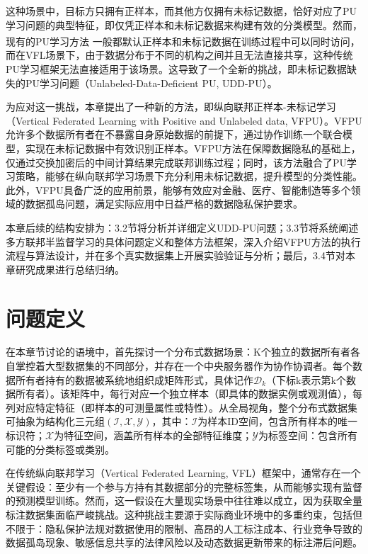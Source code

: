 这种场景中，目标方只拥有正样本，而其他方仅拥有未标记数据，恰好对应了PU学习问题的典型特征，即仅凭正样本和未标记数据来构建有效的分类模型。然而，现有的PU学习方法\textsuperscript{\cite{mordelet2014bagging, liu2003building, liu2015classification, xu2017multi}} 一般都默认正样本和未标记数据在训练过程中可以同时访问，而在VFL场景下，由于数据分布于不同的机构之间并且无法直接共享，这种传统PU学习框架无法直接适用于该场景。这导致了一个全新的挑战，即未标记数据缺失的PU学习问题（Unlabeled-Data-Deficient PU, UDD-PU）。

为应对这一挑战，本章提出了一种新的方法，即纵向联邦正样本-未标记学习（Vertical Federated Learning with Positive and Unlabeled data, VFPU）。VFPU允许多个数据所有者在不暴露自身原始数据的前提下，通过协作训练一个联合模型，实现在未标记数据中有效识别正样本。VFPU方法在保障数据隐私的基础上，仅通过交换加密后的中间计算结果完成联邦训练过程；同时，该方法融合了PU学习策略，能够在纵向联邦学习场景下充分利用未标记数据，提升模型的分类性能。此外，VFPU具备广泛的应用前景，能够有效应对金融、医疗、智能制造等多个领域的数据孤岛问题，满足实际应用中日益严格的数据隐私保护要求。

本章后续的结构安排为：3.2节将分析并详细定义UDD-PU问题；3.3节将系统阐述多方联邦半监督学习的具体问题定义和整体方法框架，深入介绍VFPU方法的执行流程与算法设计，并在多个真实数据集上开展实验验证与分析；最后，3.4节对本章研究成果进行总结归纳。



\section{问题定义}
在本章节讨论的语境中，首先探讨一个分布式数据场景：K个独立的数据所有者各自掌控着大型数据集的不同部分，并存在一个中央服务器作为协作协调者。每个数据所有者持有的数据被系统地组织成矩阵形式，具体记作${{\mathsf{\mathcal{D}}}_{k}}$（下标k表示第k个数据所有者）。该矩阵中，每行对应一个独立样本（即具体的数据实例或观测值），每列对应特定特征（即样本的可测量属性或特性）。从全局视角，整个分布式数据集可抽象为结构化三元组$(\mathsf{\mathcal{I}}, \mathsf{\mathcal{X}}, \mathsf{\mathcal{Y}})$，其中：$\mathsf{\mathcal{I}}$为样本ID空间，包含所有样本的唯一标识符；$\mathsf{\mathcal{X}}$为特征空间，涵盖所有样本的全部特征维度；$\mathsf{\mathcal{Y}}$为标签空间：包含所有可能的分类标签或类别。

在传统纵向联邦学习（Vertical Federated Learning, VFL）框架中，通常存在一个关键假设：至少有一个参与方持有其数据部分的完整标签集，从而能够实现有监督的预测模型训练。然而，这一假设在大量现实场景中往往难以成立，因为获取全量标注数据集面临严峻挑战。这种挑战主要源于实际商业环境中的多重约束，包括但不限于：隐私保护法规对数据使用的限制、高昂的人工标注成本、行业竞争导致的数据孤岛现象、敏感信息共享的法律风险以及动态数据更新带来的标注滞后问题。

